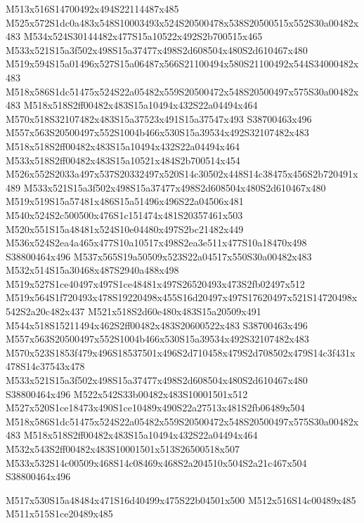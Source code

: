\documentclass{article}
\begin{document}
\begin{multicols}{2}
M513x516S14700492x494S22114487x485 M525x572S1dc0a483x548S10003493x524S20500478x538S20500515x552S30a00482x483 M534x524S30144482x477S15a10522x492S2b700515x465 M533x521S15a3f502x498S15a37477x498S2d608504x480S2d610467x480 M519x594S15a01496x527S15a06487x566S21100494x580S21100492x544S34000482x483 M518x586S1dc51475x524S22a05482x559S20500472x548S20500497x575S30a00482x483 M518x518S2ff00482x483S15a10494x432S22a04494x464 M570x518S32107482x483S15a37523x491S15a37547x493 S38700463x496 M557x563S20500497x552S1004b466x530S15a39534x492S32107482x483 M518x518S2ff00482x483S15a10494x432S22a04494x464 M533x518S2ff00482x483S15a10521x484S2b700514x454 M526x552S2033a497x537S20332497x520S14c30502x448S14c38475x456S2b720491x489 M533x521S15a3f502x498S15a37477x498S2d608504x480S2d610467x480 M519x519S15a57481x486S15a51496x496S22a04506x481 M540x524S2c500500x476S1c151474x481S20357461x503 M520x551S15a48481x524S10e04480x497S2bc21482x449 M536x524S2ea4a465x477S10a10517x498S2ea3e511x477S10a18470x498 S38800464x496 M537x565S19a50509x523S22a04517x550S30a00482x483 M532x514S15a30468x487S2940a488x498 M519x527S1ce40497x497S1ce48481x497S26520493x473S2fb02497x512 M519x564S1f720493x478S19220498x455S16d20497x497S17620497x521S14720498x542S2a20c482x437 M521x518S2d60e480x483S15a20509x491 M544x518S15211494x462S2ff00482x483S20600522x483 S38700463x496 M557x563S20500497x552S1004b466x530S15a39534x492S32107482x483 M570x523S1853f479x496S18537501x496S2d710458x479S2d708502x479S14c3f431x478S14c37543x478 M533x521S15a3f502x498S15a37477x498S2d608504x480S2d610467x480 S38800464x496 M522x542S33b00482x483S10001501x512 M527x520S1ce18473x490S1ce10489x490S22a27513x481S2fb06489x504 M518x586S1dc51475x524S22a05482x559S20500472x548S20500497x575S30a00482x483 M518x518S2ff00482x483S15a10494x432S22a04494x464 M532x543S2ff00482x483S10001501x513S26500518x507 M533x532S14c00509x468S14c08469x468S2a204510x504S2a21c467x504 S38800464x496

\begin{center}
M517x530S15a48484x471S16d40499x475S22b04501x500 M512x516S14c00489x485 M511x515S1ce20489x485 
\end{center}





\end{multicols}
\end{document}
